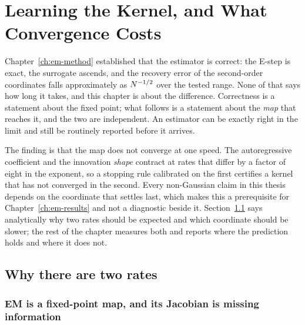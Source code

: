 \chapter{Learning the Kernel, and What Convergence Costs}\label{ch:em-kernel}

Chapter~\ref{ch:em-method} established that the estimator is correct: the
E-step is exact, the surrogate ascends, and the recovery error of the
second-order coordinates falls approximately as
$N^{-1/2}$ over the tested range. None of that says how long it takes,
and this chapter is about the difference. Correctness is a statement about the fixed point; what follows
is a statement about the \emph{map} that reaches it, and the two are
independent. An estimator can be exactly right in the limit and still be
routinely reported before it arrives.

The finding is that the map does not converge at one speed. The autoregressive
coefficient and the innovation \emph{shape} contract at rates that differ by a
factor of eight in the exponent, so a stopping rule calibrated on the first
certifies a kernel that has not converged in the second. Every non-Gaussian
claim in this thesis depends on the coordinate that settles last, which makes
this a prerequisite for Chapter~\ref{ch:em-results} and not a diagnostic beside
it. Section~\ref{sec:em-rate-theory} says analytically why two rates should be
expected and which coordinate should be slower; the rest of the chapter
measures both and reports where the prediction holds and where it does not.

\section{Why there are two rates}\label{sec:em-rate-theory}

\subsection{EM is a fixed-point map, and its Jacobian is missing information}

